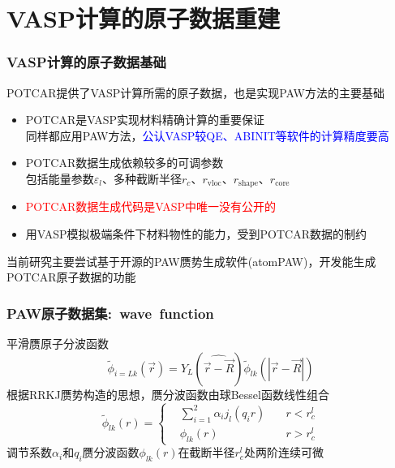 \documentclass[cjk,slidestop,compress,mathserif,blue]{beamer}
\newcommand{\upcite}[1]{\hspace{0ex}\textsuperscript{\cite{#1}}} %
\begin{document}
\section{\rm{VASP}计算的原子数据重建}
\frame
{
	\frametitle{\textrm{VASP}计算的原子数据基础}
	\textrm{POTCAR}提供了\textrm{VASP}计算所需的原子数据，也是实现\textrm{PAW}方法的主要基础
	\begin{itemize}
		\item \textrm{POTCAR}是\textrm{VASP}实现材料精确计算的重要保证\\
			同样都应用\textrm{PAW}方法，\textcolor{blue}{公认\textrm{VASP}较\textrm{QE}、\textrm{ABINIT}等软件的计算精度要高}
		\item \textrm{POTCAR}数据生成依赖较多的可调参数\\
			包括能量参数$\varepsilon_l$、多种截断半径$r_c$、$r_{\mathrm{vloc}}$、$r_{\mathrm{shape}}$、$r_{\mathrm{core}}$
		\item \textcolor{red}{\textrm{POTCAR}数据生成代码是\textrm{VASP}中唯一没有公开的}
		\item 用\textrm{VASP}模拟极端条件下材料物性的能力，受到\textrm{POTCAR}数据的制约
	\end{itemize}

当前研究主要尝试基于开源的\textrm{PAW}赝势生成软件(\textrm{atomPAW})，开发能生成\textrm{POTCAR}原子数据的功能
}

\frame
{
	\frametitle{\textrm{PAW}原子数据集:~\textrm{wave~function}}
	平滑赝原子分波函数
	\begin{displaymath}
		\tilde\phi_{i=Lk}(\vec r)=Y_L(\widehat{\vec r-\vec R})\tilde\phi_{lk}(|\vec r-\vec R|)
	\end{displaymath}
	根据\textrm{RRKJ}赝势构造的思想，赝分波函数由球\textrm{Bessel}函数线性组合%
	\begin{displaymath}
		\tilde\phi_{lk}(r)=\left\{
		\begin{aligned}
			&\sum_{i=1}^2\alpha_ij_l(q_ir)\quad &r<r_c^l\\
			&\phi_{lk}(r)\quad&r>r_c^l
		\end{aligned}
		\right.
	\end{displaymath}
	调节系数$\alpha_i$和$q_i$赝分波函数$\phi_{lk}(r)$在截断半径$r_c^l$处两阶连续可微
}
\end{document}
